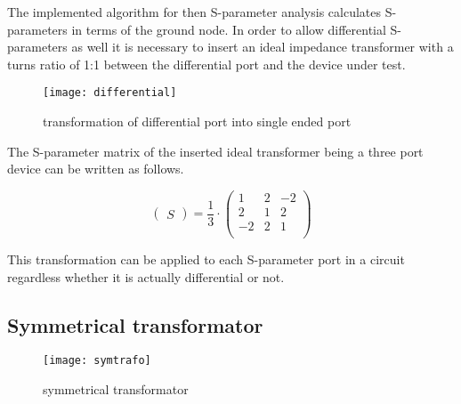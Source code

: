 \documentclass[10pt]{report}
\begin{document}
The implemented algorithm for then S-parameter analysis calculates
S-parameters in terms of the ground node.  In order to allow
differential S-parameters as well it is necessary to insert an ideal
impedance transformer with a turns ratio of 1:1 between the
differential port and the device under test.

\begin{figure}[ht]
\begin{center}
\texttt{[image: differential]}
\end{center}
\caption{transformation of differential port into single ended port}
\label{fig:differential}
\end{figure}
\FloatBarrier

The S-parameter matrix of the inserted ideal transformer being a three
port device can be written as follows.

\begin{equation}
\begin{pmatrix}
S
\end{pmatrix}
= \dfrac{1}{3}\cdot
\begin{pmatrix}
1 & 2 & -2\\
2 & 1 & 2\\
-2 & 2 & 1\\
\end{pmatrix}
\end{equation}

This transformation can be applied to each S-parameter port in a
circuit regardless whether it is actually differential or not.

\subsection*{Symmetrical transformator}

\begin{figure}[ht]
\begin{center}
\texttt{[image: symtrafo]}
\end{center}
\caption{symmetrical transformator}
\label{fig:symtrafo}
\end{figure}
\FloatBarrier
\end{document}
